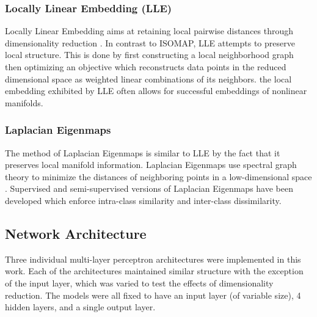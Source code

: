 \documentclass[conference]{IEEEtran}
\begin{document}
	\subsubsection*{Locally Linear Embedding (LLE)} Locally Linear Embedding aims at retaining local pairwise distances through dimensionality reduction \cite{Roweis2000LLE,Saul2001LLEIntro}.  In contrast to ISOMAP, LLE attempts to preserve local structure.  This is done by first constructing a local neighborhood graph then optimizing an objective which reconstructs data points in the reduced dimensional space as weighted linear combinations of its neighbors.  the local embedding exhibited by LLE often allows for successful embeddings of nonlinear manifolds.
	\subsubsection*{Laplacian Eigenmaps}  The method of Laplacian Eigenmaps is similar to LLE by the fact that it preserves local manifold information.  Laplacian Eigenmaps use spectral graph theory to minimize the distances of neighboring points in a low-dimensional space \cite{Belkin2003LaplacianEigenmaps,VanDerMaaten2009DRReview}.  Supervised and semi-supervised versions of Laplacian Eigenmaps have been developed which enforce intra-class similarity and inter-class dissimilarity.  
	 

	\subsection{Network Architecture}
	Three individual multi-layer perceptron architectures were implemented in this work.  Each of the architectures maintained similar structure with the exception of the input layer, which was varied to test the effects of dimensionality reduction.  The models were all fixed to have an input layer (of variable size), 4 hidden layers, and a single output layer.  
	
	
	
\end{document}
